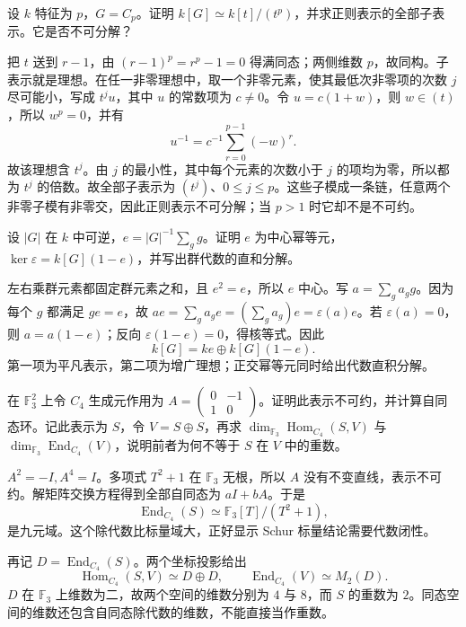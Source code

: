 \begin{exercise}\label{b5:ex:01-cyclic-modular-regular}
	设 \(k\) 特征为 \(p\)，\(G=C_p\)。证明 \(k[G]\simeq k[t]/(t^p)\)，并求正则表示的全部子表示。它是否不可分解？
\end{exercise}
\begin{solution}
	把 \(t\) 送到 \(r-1\)，由 \((r-1)^p=r^p-1=0\) 得满同态；两侧维数 \(p\)，故同构。子表示就是理想。在任一非零理想中，取一个非零元素，使其最低次非零项的次数 \(j\) 尽可能小，写成 \(t^j u\)，其中 \(u\) 的常数项为 \(c\ne0\)。令 \(u=c(1+w)\)，则 \(w\in(t)\)，所以 \(w^p=0\)，并有
	\[
		u^{-1}=c^{-1}\sum_{r=0}^{p-1}(-w)^r.
	\]
	故该理想含 \(t^j\)。由 \(j\) 的最小性，其中每个元素的次数小于 \(j\) 的项均为零，所以都为 \(t^j\) 的倍数。故全部子表示为 \((t^j)\)、\(0\le j\le p\)。这些子模成一条链，任意两个非零子模有非零交，因此正则表示不可分解；当 \(p>1\) 时它却不是不可约。
\end{solution}

\begin{exercise}\label{b5:ex:01-augmentation-idempotent}
	设 \(|G|\) 在 \(k\) 中可逆，\(e=|G|^{-1}\sum_g g\)。证明 \(e\) 为中心幂等元，\(\ker\varepsilon=k[G](1-e)\)，并写出群代数的直和分解。
\end{exercise}
\begin{solution}
	左右乘群元素都固定群元素之和，且 \(e^2=e\)，所以 \(e\) 中心。写 \(a=\sum_g a_g g\)。因为每个 \(g\) 都满足 \(ge=e\)，故 \(ae=\sum_g a_ge=(\sum_g a_g)e=\varepsilon(a)e\)。若 \(\varepsilon(a)=0\)，则 \(a=a(1-e)\)；反向 \(\varepsilon(1-e)=0\)，得核等式。因此
	\[
		k[G]=ke\oplus k[G](1-e).
	\]
	第一项为平凡表示，第二项为增广理想；正交幂等元同时给出代数直积分解。
\end{solution}

\begin{exercise}\label{b5:ex:01-finite-field-schur}
	在 \(\mathbb F_3^2\) 上令 \(C_4\) 生成元作用为 \(A=\begin{pmatrix}0&-1\\1&0\end{pmatrix}\)。证明此表示不可约，并计算自同态环。记此表示为 \(S\)，令 \(V=S\oplus S\)，再求 \(\dim_{\mathbb F_3}\operatorname{Hom}_{C_4}(S,V)\) 与 \(\dim_{\mathbb F_3}\operatorname{End}_{C_4}(V)\)，说明前者为何不等于 \(S\) 在 \(V\) 中的重数。
\end{exercise}
\begin{solution}
	\(A^2=-I,A^4=I\)。多项式 \(T^2+1\) 在 \(\mathbb F_3\) 无根，所以 \(A\) 没有不变直线，表示不可约。解矩阵交换方程得到全部自同态为 \(aI+bA\)。于是
	\[
		\operatorname{End}_{C_4}(S)\simeq\mathbb F_3[T]/(T^2+1),
	\]
	是九元域。这个除代数比标量域大，正好显示 Schur 标量结论需要代数闭性。

	再记 \(D=\operatorname{End}_{C_4}(S)\)。两个坐标投影给出
	\[
		\operatorname{Hom}_{C_4}(S,V)\simeq D\oplus D,\qquad \operatorname{End}_{C_4}(V)\simeq M_2(D).
	\]
	\(D\) 在 \(\mathbb F_3\) 上维数为二，故两个空间的维数分别为 \(4\) 与 \(8\)，而 \(S\) 的重数为 \(2\)。同态空间的维数还包含自同态除代数的维数，不能直接当作重数。
\end{solution}

